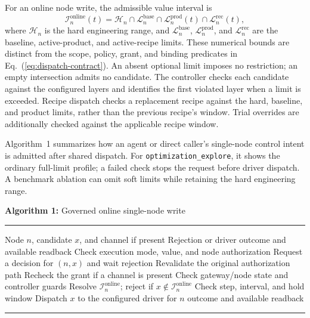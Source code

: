 \documentclass[journal]{IEEEtran}
\begin{document}
For an online node write, the admissible value interval is
\begin{equation}
\mathcal{I}^{\mathrm{online}}_n(t)=
\mathcal{H}_n\cap\mathcal{L}^{\mathrm{base}}_n\cap\mathcal{L}^{\mathrm{prod}}_n(t)\cap\mathcal{L}^{\mathrm{rec}}_n(t),
\label{eq:admission}
\end{equation}
where $\mathcal{H}_n$ is the hard engineering range, and
$\mathcal{L}^{\mathrm{base}}_n$, $\mathcal{L}^{\mathrm{prod}}_n$, and
$\mathcal{L}^{\mathrm{rec}}_n$ are the baseline, active-product, and
active-recipe limits. These numerical bounds are distinct from the scope,
policy, grant, and binding predicates in Eq.~(\ref{eq:dispatch-contract}).
An absent optional limit imposes no restriction; an empty intersection admits no
candidate. The controller checks each candidate against the configured layers
and identifies the first violated layer when a limit is exceeded. Recipe dispatch
checks a replacement recipe against the hard, baseline, and product limits,
rather than the previous recipe's window. Trial overrides are additionally checked against
the applicable recipe window.

Algorithm~1 summarizes how an agent or direct caller's single-node control intent is admitted after shared dispatch. For
\texttt{optimization\_explore}, it shows the ordinary full-limit profile; a failed
check stops the request before driver dispatch. A benchmark ablation can
omit soft limits while retaining the hard engineering range.

\par\medskip
\noindent\begin{minipage}{\columnwidth}
\small
\noindent\textbf{Algorithm 1:} Governed online single-node write
\par\kern2pt\hrule\kern2pt
\begin{algorithmic}[1]
\Require Node $n$, candidate $x$, and channel if present
\Ensure Rejection or driver outcome and available readback
\State Check execution mode, value, and node authorization
  \State Request a decision for $(n,x)$ and wait
    \State \Return rejection
  \EndIf
  \State Revalidate the original authorization path
\EndIf
\State Recheck the grant if a channel is present
\State Check gateway/node state and controller guards
\State Resolve $\mathcal{I}^{\mathrm{online}}_n$; reject if $x\notin\mathcal{I}^{\mathrm{online}}_n$
  \State Check step, interval, and hold window
\EndIf
\State Dispatch $x$ to the configured driver for $n$
\State \Return outcome and available readback
\end{algorithmic}
\kern2pt\hrule
\end{minipage}
\par\medskip
\end{document}
